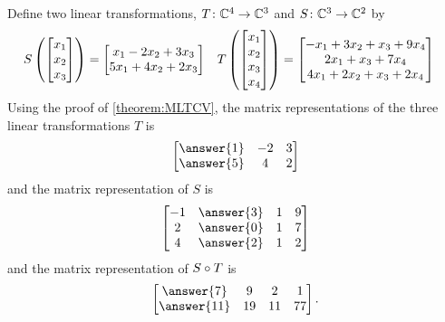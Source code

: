 \documentclass{ximera}
\begin{document}
\begin{question}
Define two linear transformations, $T\colon \mathbb{C}^{4}\rightarrow\mathbb{C}^{3}$ and $S\colon \mathbb{C}^{3}\rightarrow\mathbb{C}^{2}$ by
\begin{align*}
S\left(\begin{bmatrix}x_1\\x_2\\x_3\end{bmatrix}\right)
&=
\begin{bmatrix}
x_1-2x_2+3x_3\\
5x_1+4x_2+2x_3
\end{bmatrix}
&
T\left(\begin{bmatrix}x_1\\x_2\\x_3\\x_4\end{bmatrix}\right)
&=
\begin{bmatrix}
-x_1+3x_2+x_3+9x_4\\
2x_1+x_3+7x_4\\
4x_1+2x_2+x_3+2x_4
\end{bmatrix}
\end{align*}
Using the proof of \ref{theorem:MLTCV}, the matrix representations of the three linear transformations $T$ is
\[
\begin{bmatrix}
\answer{1} & -2 & 3\\
\answer{5} & 4 & 2
\end{bmatrix}
\]
and the matrix representation of $S$ is
\[
\begin{bmatrix}
-1 & \answer{3} & 1 & 9 \\
 2 & \answer{0} & 1 & 7 \\
 4 & \answer{2} & 1 & 2
\end{bmatrix}
\]
and the matrix representation of ${S}\circ{T}$ is
\[
\begin{bmatrix}
\answer{7} & 9 & 2 & 1 \\
\answer{11} & 19 & 11 & 77
\end{bmatrix}.
\]
\end{question}
\end{document}
